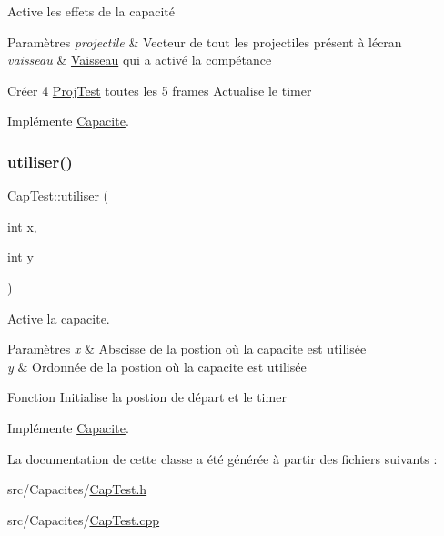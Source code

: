 Active les effets de la capacité 


\begin{DoxyParams}{Paramètres}
{\em projectile} & Vecteur de tout les projectiles présent à l\textquotesingle{}écran \\
\hline
{\em vaisseau} & \hyperlink{class_vaisseau}{Vaisseau} qui a activé la compétance\\
\hline
\end{DoxyParams}
Créer 4 \hyperlink{class_proj_test}{Proj\+Test} toutes les 5 frames Actualise le timer 

Implémente \hyperlink{class_capacite_a75c9621d7a704fedb10ad29c6a697d64}{Capacite}.

\mbox{\label{class_cap_test_a9c85a17dec6cf78f1438b08b175f650d}} 
\subsubsection{\texorpdfstring{utiliser()}{utiliser()}}
{\footnotesize\ttfamily Cap\+Test\+::utiliser (\begin{DoxyParamCaption}\item[{int}]{x,  }\item[{int}]{y }\end{DoxyParamCaption})\hspace{0.3cm}{\ttfamily [virtual]}}



Active la capacite. 


\begin{DoxyParams}{Paramètres}
{\em x} & Abscisse de la postion où la capacite est utilisée \\
\hline
{\em y} & Ordonnée de la postion où la capacite est utilisée\\
\hline
\end{DoxyParams}
Fonction Initialise la postion de départ et le timer 

Implémente \hyperlink{class_capacite_a6f5e6efda11f80ab8538e23f5bdc6e79}{Capacite}.



La documentation de cette classe a été générée à partir des fichiers suivants \+:\begin{DoxyCompactItemize}
\item 
src/\+Capacites/\hyperlink{_cap_test_8h}{Cap\+Test.\+h}\item 
src/\+Capacites/\hyperlink{_cap_test_8cpp}{Cap\+Test.\+cpp}\end{DoxyCompactItemize}
